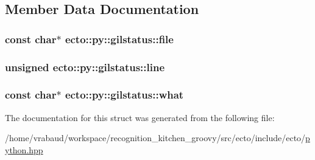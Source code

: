 \subsection{\-Member \-Data \-Documentation}
\hypertarget{structecto_1_1py_1_1gilstatus_a454efe188c683788ca52b64b1c87245b}{
\subsubsection[{file}]{\setlength{\rightskip}{0pt plus 5cm}const char$\ast$ {\bf ecto\-::py\-::gilstatus\-::file}}}\label{structecto_1_1py_1_1gilstatus_a454efe188c683788ca52b64b1c87245b}
\hypertarget{structecto_1_1py_1_1gilstatus_a86f9f360d4950496f737ce0faa4d7e1b}{
\subsubsection[{line}]{\setlength{\rightskip}{0pt plus 5cm}unsigned {\bf ecto\-::py\-::gilstatus\-::line}}}\label{structecto_1_1py_1_1gilstatus_a86f9f360d4950496f737ce0faa4d7e1b}
\hypertarget{structecto_1_1py_1_1gilstatus_aaeba7e13dad90eaefa0a3c119e0a33ff}{
\subsubsection[{what}]{\setlength{\rightskip}{0pt plus 5cm}const char$\ast$ {\bf ecto\-::py\-::gilstatus\-::what}}}\label{structecto_1_1py_1_1gilstatus_aaeba7e13dad90eaefa0a3c119e0a33ff}


\-The documentation for this struct was generated from the following file\-:\begin{DoxyCompactItemize}
\item 
/home/vrabaud/workspace/recognition\-\_\-kitchen\-\_\-groovy/src/ecto/include/ecto/\hyperlink{python_8hpp}{python.\-hpp}\end{DoxyCompactItemize}
